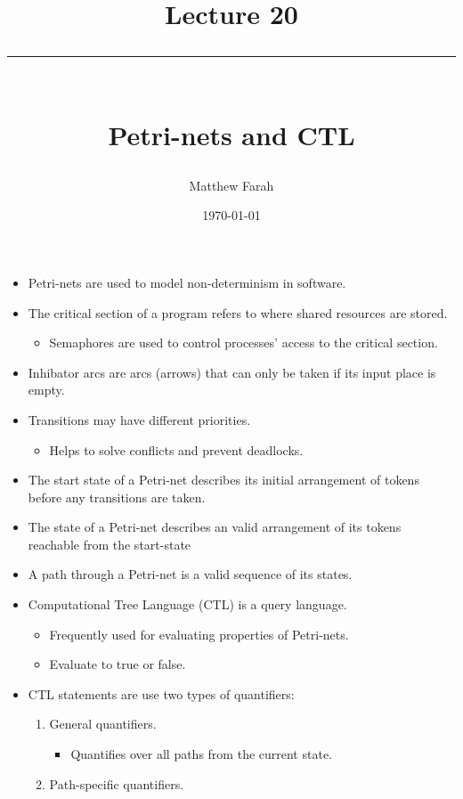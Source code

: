 \documentclass{article}
\date{
	\vspace{-.75em}
	{\large \today}
}
\title{
	\vspace*{-1.5em}
	{\Huge Lecture 20} \\
	\vspace{-1em}
	\rule{\textwidth/4}{.01em} \\
	\vspace{-.25em}
	{\Large Petri-nets and CTL}
	\vspace{-.75em}
}
\author{
	{\large Matthew Farah}
}
\begin{document}
\maketitle
\pagestyle{fancy}

\fi

\begin{itemize}
	\item Petri-nets are used to model non-determinism in software.
	\item The critical section of a program refers to where shared resources are stored.
	\begin{itemize}
		\item Semaphores are used to control processes' access to the critical section.
	\end{itemize}
	\item Inhibator arcs are arcs (arrows) that can only be taken if its input place is empty.
	\item Transitions may have different priorities.
	\begin{itemize}
		\item Helps to solve conflicts and prevent deadlocks.
	\end{itemize}
	\item The start state of a Petri-net describes its initial arrangement of tokens before any transitions are taken.
	\item The state of a Petri-net describes an valid arrangement of its tokens reachable from the start-state
	\item A path through a Petri-net is a valid sequence of its states.
	\item Computational Tree Language (CTL) is a query language.
	\begin{itemize}
		\item Frequently used for evaluating properties of Petri-nets.
		\item Evaluate to true or false.
	\end{itemize}
	\item CTL statements are use two types of quantifiers:
	\begin{enumerate}
		\item General quantifiers.
		\begin{itemize}
			\item Quantifies over all paths from the current state.
		\end{itemize}
		\item Path-specific quantifiers.
		\begin{itemize}

\end{itemize}
\end{enumerate}
\end{itemize}
\end{document}

